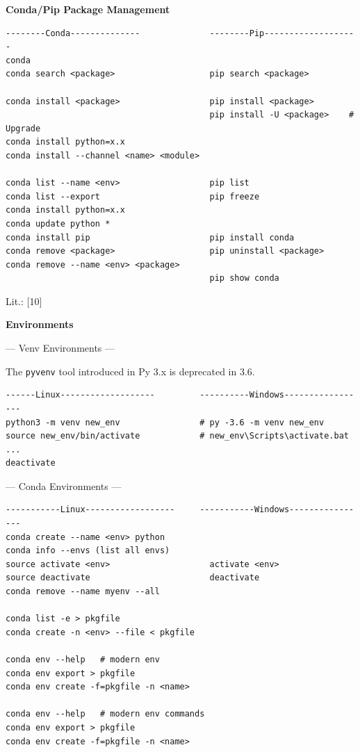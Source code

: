 \documentclass[9pt,a4wide]{extarticle}
\begin{document}
\medskip
{\bf Conda/Pip Package Management}

\begin{verbatim}
--------Conda--------------              --------Pip-------------------
conda 
conda search <package>                   pip search <package>

conda install <package>                  pip install <package>
                                         pip install -U <package>    # Upgrade
conda install python=x.x  
conda install --channel <name> <module>

conda list --name <env>                  pip list
conda list --export                      pip freeze
conda install python=x.x
conda update python *
conda install pip                        pip install conda
conda remove <package>                   pip uninstall <package>
conda remove --name <env> <package>
                                         pip show conda
\end{verbatim}

Lit.: [10]


\medskip
{\bf Environments}

--- Venv Environments ---

The {\tt pyvenv} tool introduced in Py 3.x is deprecated in 3.6.

\begin{verbatim}
------Linux-------------------         ----------Windows-----------------
python3 -m venv new_env                # py -3.6 -m venv new_env 
source new_env/bin/activate            # new_env\Scripts\activate.bat 
...
deactivate
\end{verbatim}


--- Conda Environments ---

\begin{verbatim}
-----------Linux------------------     -----------Windows----------------
conda create --name <env> python         
conda info --envs (list all envs)        
source activate <env>                    activate <env>
source deactivate                        deactivate
conda remove --name myenv --all

conda list -e > pkgfile
conda create -n <env> --file < pkgfile
                                         
conda env --help   # modern env
conda env export > pkgfile 
conda env create -f=pkgfile -n <name>
                                         
conda env --help   # modern env commands
conda env export > pkgfile 
conda env create -f=pkgfile -n <name>
\end{verbatim}
\end{document}
